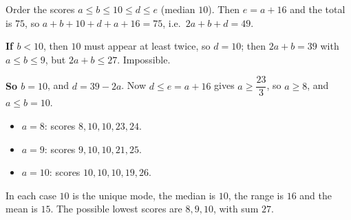 Order the scores $a\le b\le10\le d\le e$ (median $10$). Then $e=a+16$ and the total is $75$, so $a+b+10+d+a+16=75$, i.e.\ $2a+b+d=49$.

\textbf{If $b<10$}, then $10$ must appear at least twice, so $d=10$; then $2a+b=39$ with $a\le b\le9$, but $2a+b\le27$. Impossible.

\textbf{So $b=10$}, and $d=39-2a$. Now $d\le e=a+16$ gives $a\ge\dfrac{23}{3}$, so $a\ge8$, and $a\le b=10$.
\begin{itemize}
\item $a=8$: scores $8,10,10,23,24$.
\item $a=9$: scores $9,10,10,21,25$.
\item $a=10$: scores $10,10,10,19,26$.
\end{itemize}
In each case $10$ is the unique mode, the median is $10$, the range is $16$ and the mean is $15$. The possible lowest scores are $8,9,10$, with sum $\boxed{27}$.
